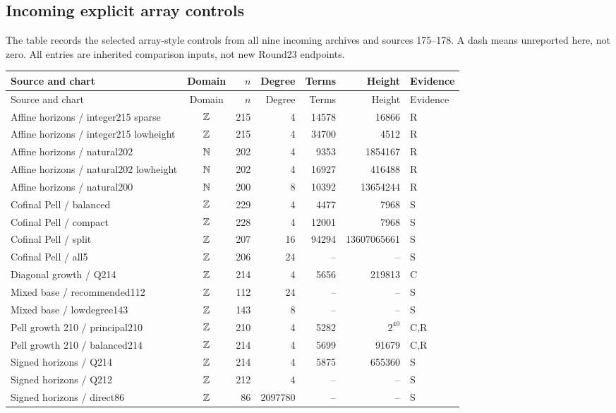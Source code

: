 \subsection{Incoming explicit array controls}
The table records the selected array-style controls from all nine incoming
archives and sources 175--178. A dash means unreported here, not zero.
All entries are inherited comparison inputs, not new Round23 endpoints.


\begingroup\scriptsize\setlength{\tabcolsep}{4pt}
\begin{longtable}{@{}p{43mm}crrrrl@{}}
\toprule
Source and chart & Domain & $n$ & Degree & Terms & Height & Evidence\\\midrule\endfirsthead
\toprule Source and chart & Domain & $n$ & Degree & Terms & Height & Evidence\\\midrule\endhead
\bottomrule\endfoot
Affine horizons / integer215 sparse & $\mathbb Z$ & 215 & 4 & 14578 & 16866 & R\\
Affine horizons / integer215 lowheight & $\mathbb Z$ & 215 & 4 & 34700 & 4512 & R\\
Affine horizons / natural202 & $\mathbb N$ & 202 & 4 & 9353 & 1854167 & R\\
Affine horizons / natural202 lowheight & $\mathbb N$ & 202 & 4 & 16927 & 416488 & R\\
Affine horizons / natural200 & $\mathbb N$ & 200 & 8 & 10392 & 13654244 & R\\
Cofinal Pell / balanced & $\mathbb Z$ & 229 & 4 & 4477 & 7968 & S\\
Cofinal Pell / compact & $\mathbb Z$ & 228 & 4 & 12001 & 7968 & S\\
Cofinal Pell / split & $\mathbb Z$ & 207 & 16 & 94294 & 13607065661 & S\\
Cofinal Pell / all5 & $\mathbb Z$ & 206 & 24 & -- & -- & S\\
Diagonal growth / Q214 & $\mathbb Z$ & 214 & 4 & 5656 & 219813 & C\\
Mixed base / recommended112 & $\mathbb Z$ & 112 & 24 & -- & -- & S\\
Mixed base / lowdegree143 & $\mathbb Z$ & 143 & 8 & -- & -- & S\\
Pell growth 210 / principal210 & $\mathbb Z$ & 210 & 4 & 5282 & $2^{40}$ & C,R\\
Pell growth 210 / balanced214 & $\mathbb Z$ & 214 & 4 & 5699 & 91679 & C,R\\
Signed horizons / Q214 & $\mathbb Z$ & 214 & 4 & 5875 & 655360 & S\\
Signed horizons / Q212 & $\mathbb Z$ & 212 & 4 & -- & -- & S\\
Signed horizons / direct86 & $\mathbb Z$ & 86 & 2097780 & -- & -- & S\\

\end{longtable}
